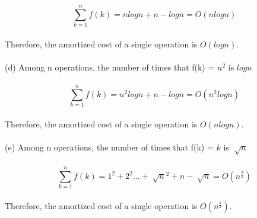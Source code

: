 \begin{problem}{5}
$$\sum_{k=1}^{n} f(k) = nlogn + n - logn = O(nlogn)$$\\
Therefore, the amortized cost of a single operation is $O(logn)$.\\
\\
(d) Among n operations, the number of times that f(k) =  $n^2$ is $logn$\\
\\
$$\sum_{k=1}^{n} f(k) = n^2 logn + n - logn = O(n^2 logn)$$\\
Therefore, the amortized cost of a single operation is $O(nlogn)$.\\
\\
(e) Among n operations, the number of times that f(k) =  $k$ is $\sqrt[]{n}$\\
\\
$$\sum_{k=1}^{n} f(k) = 1^2 + 2^2 ... + \sqrt[]{n}^2 + n - \sqrt[]{n} = O(n^{\frac{3}{2}})$$\\
Therefore, the amortized cost of a single operation is $O(n^\frac{1}{2})$.\\
\end{problem}